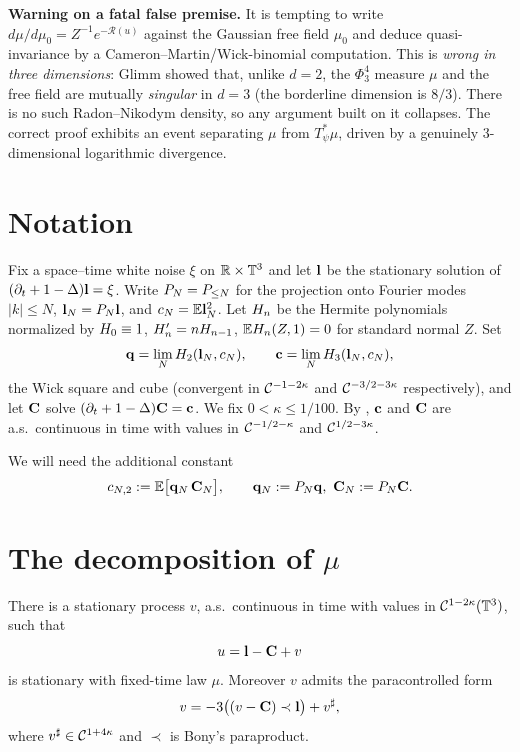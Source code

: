 \documentclass[11pt]{article}
\begin{document}
\medskip
\noindent\textbf{Warning on a fatal false premise.} It is tempting to write
$d\mu/d\mu_0=Z^{-1}e^{-\mathcal R(u)}$ against the Gaussian free field $\mu_0$
and deduce quasi-invariance by a Cameron--Martin/Wick-binomial computation. This
is \emph{wrong in three dimensions}: Glimm showed that, unlike $d=2$, the
$\Phi^4_3$ measure $\mu$ and the free field are mutually \emph{singular} in
$d=3$ (the borderline dimension is $8/3$). There is no such Radon--Nikodym
density, so any argument built on it collapses. The correct proof exhibits an
event separating $\mu$ from $T_\psi^*\mu$, driven by a genuinely
$3$-dimensional logarithmic divergence.

\section*{Notation}

Fix a space--time white noise $\xi$ on $\mathbb{R}\times\mathbb{T}^3$ and let $\mathbf{l}$ be the
stationary solution of $(\partial_t+1-\Delta)\mathbf{l}=\xi$. Write $P_N=P_{\le N}$ for
the projection onto Fourier modes $|k|\le N$, $\mathbf{l}_N=P_N\mathbf{l}$, and
$c_N=\mathbb{E}\mathbf{l}_N^2$. Let $H_n$ be the Hermite polynomials normalized by
$H_0\equiv1$, $H_n'=nH_{n-1}$, $\mathbb{E}H_n(Z,1)=0$ for standard normal $Z$. Set
\[
\mathbf{q}=\lim_{N}H_2(\mathbf{l}_N,c_N),\qquad \mathbf{c}=\lim_NH_3(\mathbf{l}_N,c_N),
\]
the Wick square and cube (convergent in $\mathcal{C}^{-1-2\kappa}$ and $\mathcal{C}^{-3/2-3\kappa}$
respectively), and let $\mathbf{C}$ solve $(\partial_t+1-\Delta)\mathbf{C}=\mathbf{c}$. We fix
$0<\kappa\le 1/100$. By \cite{HKN24}, $\mathbf{c}$ and $\mathbf{C}$ are a.s.\ continuous in
time with values in $\mathcal{C}^{-1/2-\kappa}$ and $\mathcal{C}^{1/2-3\kappa}$.

We will need the additional constant
\begin{equation}\label{eq:cN2}
c_{N,2}:=\mathbb{E}\bigl[\mathbf{q}_N\,\mathbf{C}_N\bigr],\qquad \mathbf{q}_N:=P_N\mathbf{q},\ \mathbf{C}_N:=P_N\mathbf{C}.
\end{equation}

\section*{The decomposition of $\mu$}

\begin{qoneproposition}[\cite{HM18,EW24,CC18}]\label{prop:decomp}
There is a stationary process $v$, a.s.\ continuous in time with values in
$\mathcal{C}^{1-2\kappa}(\mathbb{T}^3)$, such that
\begin{equation}\label{eq:u}
u=\mathbf{l}-\mathbf{C}+v
\end{equation}
is stationary with fixed-time law $\mu$. Moreover $v$ admits the paracontrolled
form
\begin{equation}\label{eq:v}
v=-3\bigl((v-\mathbf{C})\prec\mathbf{l}\bigr)+v^\sharp,
\end{equation}
where $v^\sharp\in\mathcal{C}^{1+4\kappa}$ and $\prec$ is Bony's paraproduct.
\end{qoneproposition}
\end{document}
